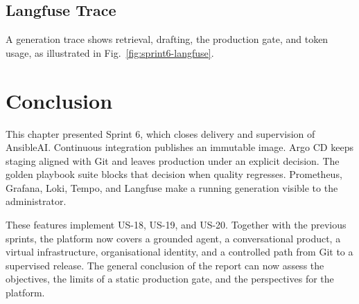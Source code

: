 \subsection{Langfuse Trace}

A generation trace shows retrieval, drafting, the production gate, and token usage, as illustrated in Fig.~\ref{fig:sprint6-langfuse}.


\section{Conclusion}

This chapter presented Sprint 6, which closes delivery and supervision of AnsibleAI. Continuous integration publishes an immutable image. Argo CD keeps staging aligned with Git and leaves production under an explicit decision. The golden playbook suite blocks that decision when quality regresses. Prometheus, Grafana, Loki, Tempo, and Langfuse make a running generation visible to the administrator.

These features implement US-18, US-19, and US-20. Together with the previous sprints, the platform now covers a grounded agent, a conversational product, a virtual infrastructure, organisational identity, and a controlled path from Git to a supervised release. The general conclusion of the report can now assess the objectives, the limits of a static production gate, and the perspectives for the platform.

